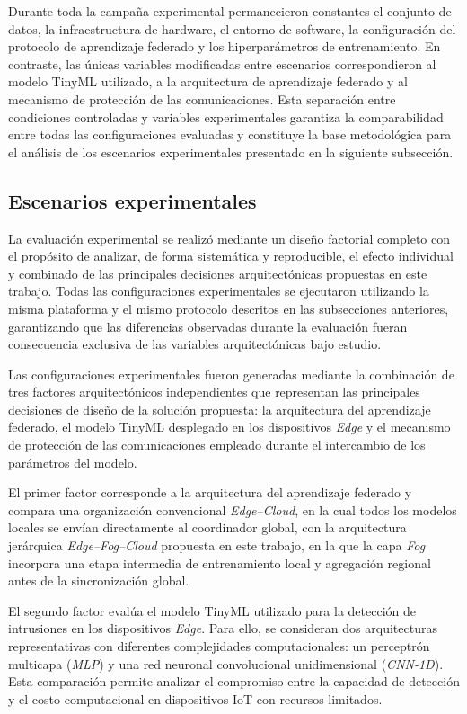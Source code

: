 \documentclass[journal,article,submit,moreauthors]{Definitions/mdpi}
\begin{document}
Durante toda la campaña experimental permanecieron constantes el conjunto de datos, la infraestructura de hardware, el entorno de software, la configuración del protocolo de aprendizaje federado y los hiperparámetros de entrenamiento. En contraste, las únicas variables modificadas entre escenarios correspondieron al modelo TinyML utilizado, a la arquitectura de aprendizaje federado y al mecanismo de protección de las comunicaciones. Esta separación entre condiciones controladas y variables experimentales garantiza la comparabilidad entre todas las configuraciones evaluadas y constituye la base metodológica para el análisis de los escenarios experimentales presentado en la siguiente subsección.


\subsection{Escenarios experimentales}
La evaluación experimental se realizó mediante un diseño factorial completo con el propósito de analizar, de forma sistemática y reproducible, el efecto individual y combinado de las principales decisiones arquitectónicas propuestas en este trabajo. Todas las configuraciones experimentales se ejecutaron utilizando la misma plataforma y el mismo protocolo descritos en las subsecciones anteriores, garantizando que las diferencias observadas durante la evaluación fueran consecuencia exclusiva de las variables arquitectónicas bajo estudio.

Las configuraciones experimentales fueron generadas mediante la combinación de tres factores arquitectónicos independientes que representan las principales decisiones de diseño de la solución propuesta: la arquitectura del aprendizaje federado, el modelo TinyML desplegado en los dispositivos \textit{Edge} y el mecanismo de protección de las comunicaciones empleado durante el intercambio de los parámetros del modelo.

El primer factor corresponde a la arquitectura del aprendizaje federado y compara una organización convencional \textit{Edge--Cloud}, en la cual todos los modelos locales se envían directamente al coordinador global, con la arquitectura jerárquica \textit{Edge--Fog--Cloud} propuesta en este trabajo, en la que la capa \textit{Fog} incorpora una etapa intermedia de entrenamiento local y agregación regional antes de la sincronización global.

El segundo factor evalúa el modelo TinyML utilizado para la detección de intrusiones en los dispositivos \textit{Edge}. Para ello, se consideran dos arquitecturas representativas con diferentes complejidades computacionales: un perceptrón multicapa (\textit{MLP}) y una red neuronal convolucional unidimensional (\textit{CNN-1D}). Esta comparación permite analizar el compromiso entre la capacidad de detección y el costo computacional en dispositivos IoT con recursos limitados.
\end{document}
